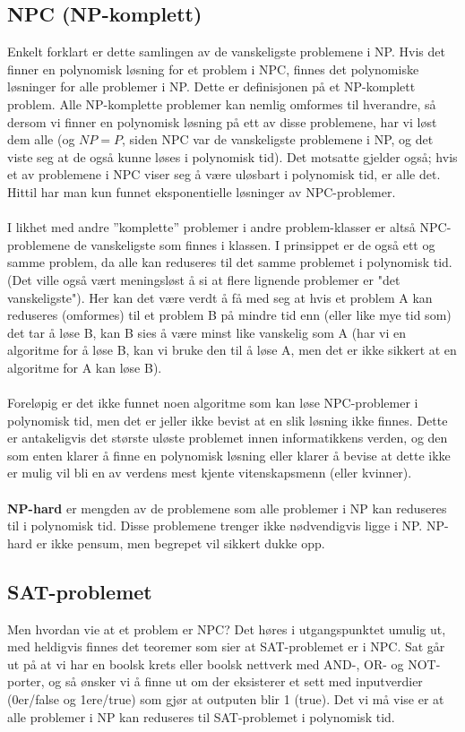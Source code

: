 \subsection{NPC (NP-komplett)}
Enkelt forklart er dette samlingen av de vanskeligste problemene i NP. Hvis det finner en polynomisk løsning for et problem i NPC, finnes det polynomiske løsninger for alle problemer i NP. Dette er definisjonen på et NP-komplett problem. Alle NP-komplette problemer kan nemlig omformes til hverandre, så dersom vi finner en polynomisk løsning på ett av disse problemene, har vi løst dem alle (og $NP = P$, siden NPC var de vanskeligste problemene i NP, og det viste seg at de også kunne løses i polynomisk tid). Det motsatte gjelder også; hvis et av problemene i NPC viser seg å være uløsbart i polynomisk tid, er alle det. Hittil har man kun funnet eksponentielle løsninger av NPC-problemer.
\\\\
I likhet med andre ''komplette'' problemer i andre problem-klasser er altså NPC-problemene de vanskeligste som finnes i klassen. I prinsippet er de også ett og samme problem, da alle kan reduseres til det samme problemet i polynomisk tid. (Det ville også vært meningsløst å si at flere lignende problemer er "det vanskeligste"). Her kan det være verdt å få med seg at hvis et problem A kan reduseres (omformes) til et problem B på mindre tid enn (eller like mye tid som) det tar å løse B, kan B sies å være minst like vanskelig som A (har vi en algoritme for å løse B, kan vi bruke den til å løse A, men det er ikke sikkert at en algoritme for A kan løse B).
\\\\
Foreløpig er det ikke funnet noen algoritme som kan løse NPC-problemer i polynomisk tid, men det er jeller ikke bevist at en slik løsning ikke finnes. Dette er antakeligvis det største uløste problemet innen informatikkens verden, og den som enten klarer å finne en polynomisk løsning eller klarer å bevise at dette ikke er mulig vil bli en av verdens mest kjente vitenskapsmenn (eller kvinner).
\\\\
\textbf{NP-hard} er mengden av de problemene som alle problemer i NP kan reduseres til i polynomisk tid. Disse problemene trenger ikke nødvendigvis ligge i NP. NP-hard er ikke pensum, men begrepet vil sikkert dukke opp.

\subsection{SAT-problemet}
Men hvordan vie at et problem er NPC? Det høres i utgangspunktet umulig ut, med heldigvis finnes det teoremer som sier at SAT-problemet er i NPC. Sat går ut på at vi har en boolsk krets eller boolsk nettverk med AND-, OR- og NOT-porter, og så ønsker vi å finne ut om der eksisterer et sett med inputverdier (0er/false og 1ere/true) som gjør at outputen blir 1 (true). Det vi må vise er at alle problemer i NP kan reduseres til SAT-problemet i polynomisk tid.

